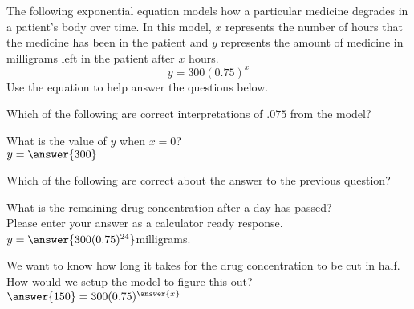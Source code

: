 \documentclass{ximera}
\author{David Kish}
\begin{document}
The following exponential equation models how a particular medicine degrades in a patient's body over time. In this model, $x$ represents the number of hours that the medicine has been in the patient and $y$ represents the amount of medicine in milligrams left in the patient after $x$ hours.
\[
y=300(0.75)^x
\]
Use the equation to help answer the questions below.

\begin{exercise}
Which of the following are correct interpretations of $.075$ from the model?
  \begin{selectAll}
  \end{selectAll}
\end{exercise}
\begin{exercise}
What is the value of $y$ when $x=0$?\\
$y=\answer{300}$ 
\end{exercise}
\begin{exercise}
Which of the following are correct about the answer to the previous question?
  \begin{selectAll}
  \end{selectAll}
\end{exercise}
\begin{exercise}
What is the remaining drug concentration after a day has passed?\\
Please enter your answer as a calculator ready response.\\
$y=\answer{300(0.75)^{24}}$milligrams.
\end{exercise}
\begin{exercise}
We want to know how long it takes for the drug concentration to be cut in half. How would we setup the model to figure this out?\\
$\answer{150}=300(0.75)^{\answer{x}}$
\end{exercise}
\end{document}
